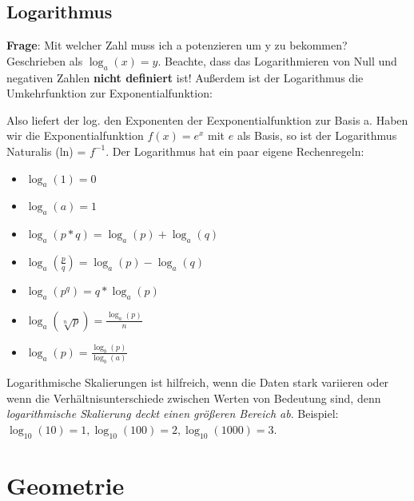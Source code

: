 \documentclass[letterpaper, titlepage]{article}
\begin{document}
\subsection{Logarithmus}\label{Logarithmus}
\textbf{Frage}: Mit welcher Zahl muss ich a potenzieren um y zu bekommen? Geschrieben als $\log_a(x)=y$. Beachte, dass das Logarithmieren von Null und negativen Zahlen \textbf{nicht definiert} ist! 
\skiptwolines
Außerdem ist der Logarithmus die Umkehrfunktion zur Exponentialfunktion:
 
Also liefert der log. den Exponenten der Eexponentialfunktion zur Basis a. Haben wir die Exponentialfunktion $f(x)=e^x$ mit $e$ als Basis, so ist der Logarithmus Naturalis (ln) = $f^{-1}$. Der Logarithmus hat ein paar eigene Rechenregeln:\\
\begin{itemize}
    \item $\log_a(1)=0$
    \item $\log_a(a)=1$
    \item $\log_a(p*q)=\log_a(p)+\log_a(q)$
    \item $\log_a(\frac{p}{q})=\log_a(p)-\log_a(q)$
    \item $\log_a(p^q)=q*\log_a(p)$
    \item $\log_a(\sqrt[n]{p})=\frac{\log_a(p)}{n}$
    \item $\log_a(p)=\frac{\log_b(p)}{\log_b(a)}$
\end{itemize}
\vspace{0.6cm}
Logarithmische Skalierungen ist hilfreich, wenn die Daten stark variieren oder wenn die Verhältnisunterschiede zwischen Werten von Bedeutung sind, denn \textit{logarithmische Skalierung deckt einen größeren Bereich ab}. Beispiel:
\skiptwolines
$\log_{10}(10)=1, \log_{10}(100)=2, \log_{10}(1000)=3$.


\section{Geometrie}\label{Gemoetrie}
\end{document}
